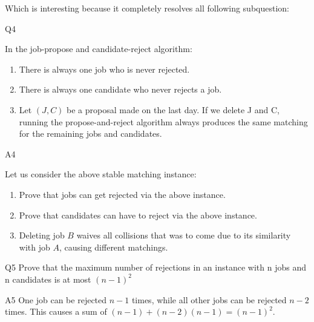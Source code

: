 Which is interesting because it completely resolves all following subquestion:
\begin{bindenum}
    \item[Q4] {
        In the job-propose and candidate-reject algorithm:
        \begin{enumerate}
            \item There is always one job who is never rejected.
            \item There is always one candidate who never rejects a job.
            \item Let $(J, C)$ be a proposal made on the last day. If we delete J and C, running the propose-and-reject algorithm always produces the same matching for the remaining jobs and candidates.
        \end{enumerate}
    }
    \item[A4] {
        Let us consider the above stable matching instance:\\
        \begin{enumerate}
            \item{
                Prove that jobs can get rejected via the above instance.
            }
            \item{
                Prove that candidates can have to reject via the above instance.
            }
            \item{
                Deleting job $B$ waives all collisions that was to come due to its similarity with job $A$, causing different matchings.
            }
        \end{enumerate}
    }
\end{bindenum}
\begin{bindenum}
    \item[Q5] {
        Prove that the maximum number of rejections in an instance with n jobs and n candidates is at most ${(n−1)}^2$
    }
    \item[A5] {
        One job can be rejected $n - 1$ times, while all other jobs can be rejected $n - 2$ times. This causes a sum of $(n - 1) + (n - 2)(n - 1) = {(n - 1)}^2$.
    }
\end{bindenum}

